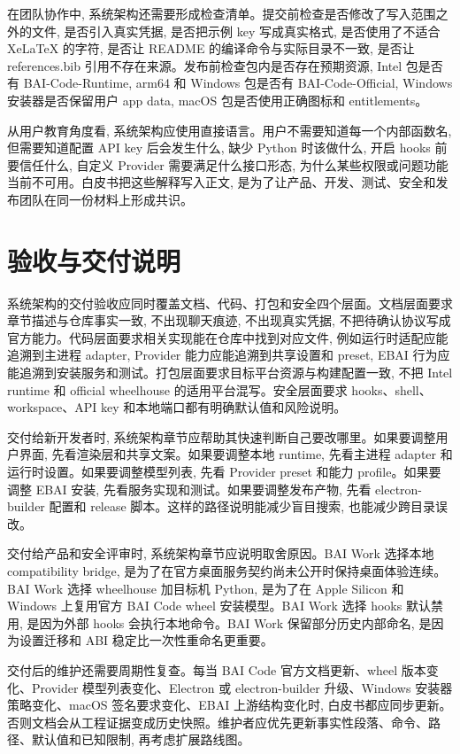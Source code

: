 在团队协作中, 系统架构还需要形成检查清单。提交前检查是否修改了写入范围之外的文件, 是否引入真实凭据, 是否把示例 key 写成真实格式, 是否使用了不适合 XeLaTeX 的字符, 是否让 README 的编译命令与实际目录不一致, 是否让 references.bib 引用不存在来源。发布前检查包内是否存在预期资源, Intel 包是否有 BAI-Code-Runtime, arm64 和 Windows 包是否有 BAI-Code-Official, Windows 安装器是否保留用户 app data, macOS 包是否使用正确图标和 entitlements。

从用户教育角度看, 系统架构应使用直接语言。用户不需要知道每一个内部函数名, 但需要知道配置 API key 后会发生什么, 缺少 Python 时该做什么, 开启 hooks 前要信任什么, 自定义 Provider 需要满足什么接口形态, 为什么某些权限或问题功能当前不可用。白皮书把这些解释写入正文, 是为了让产品、开发、测试、安全和发布团队在同一份材料上形成共识。

\section{验收与交付说明}
系统架构的交付验收应同时覆盖文档、代码、打包和安全四个层面。文档层面要求章节描述与仓库事实一致, 不出现聊天痕迹, 不出现真实凭据, 不把待确认协议写成官方能力。代码层面要求相关实现能在仓库中找到对应文件, 例如运行时适配应能追溯到主进程 adapter, Provider 能力应能追溯到共享设置和 preset, EBAI 行为应能追溯到安装服务和测试。打包层面要求目标平台资源与构建配置一致, 不把 Intel runtime 和 official wheelhouse 的适用平台混写。安全层面要求 hooks、shell、workspace、API key 和本地端口都有明确默认值和风险说明。

交付给新开发者时, 系统架构章节应帮助其快速判断自己要改哪里。如果要调整用户界面, 先看渲染层和共享文案。如果要调整本地 runtime, 先看主进程 adapter 和运行时设置。如果要调整模型列表, 先看 Provider preset 和能力 profile。如果要调整 EBAI 安装, 先看服务实现和测试。如果要调整发布产物, 先看 electron-builder 配置和 release 脚本。这样的路径说明能减少盲目搜索, 也能减少跨目录误改。

交付给产品和安全评审时, 系统架构章节应说明取舍原因。BAI Work 选择本地 compatibility bridge, 是为了在官方桌面服务契约尚未公开时保持桌面体验连续。BAI Work 选择 wheelhouse 加目标机 Python, 是为了在 Apple Silicon 和 Windows 上复用官方 BAI Code wheel 安装模型。BAI Work 选择 hooks 默认禁用, 是因为外部 hooks 会执行本地命令。BAI Work 保留部分历史内部命名, 是因为设置迁移和 ABI 稳定比一次性重命名更重要。

交付后的维护还需要周期性复查。每当 BAI Code 官方文档更新、wheel 版本变化、Provider 模型列表变化、Electron 或 electron-builder 升级、Windows 安装器策略变化、macOS 签名要求变化、EBAI 上游结构变化时, 白皮书都应同步更新。否则文档会从工程证据变成历史快照。维护者应优先更新事实性段落、命令、路径、默认值和已知限制, 再考虑扩展路线图。

